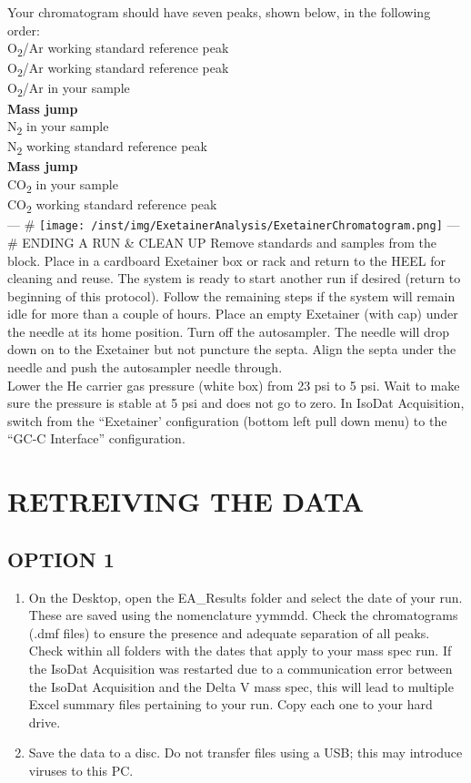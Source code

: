 \documentclass[]{article}
\providecommand{\tightlist}{%
  \setlength{\itemsep}{0pt}\setlength{\parskip}{0pt}}
\begin{document}
Your chromatogram should have seven peaks, shown below, in the following
order:\\
O\textsubscript{2}/Ar working standard reference peak\\
O\textsubscript{2}/Ar working standard reference peak\\
O\textsubscript{2}/Ar in your sample\\
\textbf{Mass jump}\\
N\textsubscript{2} in your sample\\
N\textsubscript{2} working standard reference peak\\
\textbf{Mass jump}\\
CO\textsubscript{2} in your sample\\
CO\textsubscript{2} working standard reference peak\\
--- \#
\texttt{[image: /inst/img/ExetainerAnalysis/ExetainerChromatogram.png]}
--- \# ENDING A RUN \& CLEAN UP Remove standards and samples from the
block. Place in a cardboard Exetainer box or rack and return to the HEEL
for cleaning and reuse. The system is ready to start another run if
desired (return to beginning of this protocol). Follow the remaining
steps if the system will remain idle for more than a couple of hours.
Place an empty Exetainer (with cap) under the needle at its home
position. Turn off the autosampler. The needle will drop down on to the
Exetainer but not puncture the septa. Align the septa under the needle
and push the autosampler needle through.\\
Lower the He carrier gas pressure (white box) from 23 psi to 5 psi. Wait
to make sure the pressure is stable at 5 psi and does not go to zero. In
IsoDat Acquisition, switch from the ``Exetainer' configuration (bottom
left pull down menu) to the ``GC-C Interface'' configuration.

\section{RETREIVING THE DATA}\label{retreiving-the-data}

\subsection{OPTION 1}\label{option-1}

\begin{enumerate}
\def\labelenumi{\arabic{enumi}.}
\tightlist
\item
  On the Desktop, open the EA\_Results folder and select the date of
  your run. These are saved using the nomenclature yymmdd. Check the
  chromatograms (.dmf files) to ensure the presence and adequate
  separation of all peaks. Check within all folders with the dates that
  apply to your mass spec run. If the IsoDat Acquisition was restarted
  due to a communication error between the IsoDat Acquisition and the
  Delta V mass spec, this will lead to multiple Excel summary files
  pertaining to your run. Copy each one to your hard drive.
\item
  Save the data to a disc. Do not transfer files using a USB; this may
  introduce viruses to this PC.
\end{enumerate}
\end{document}
